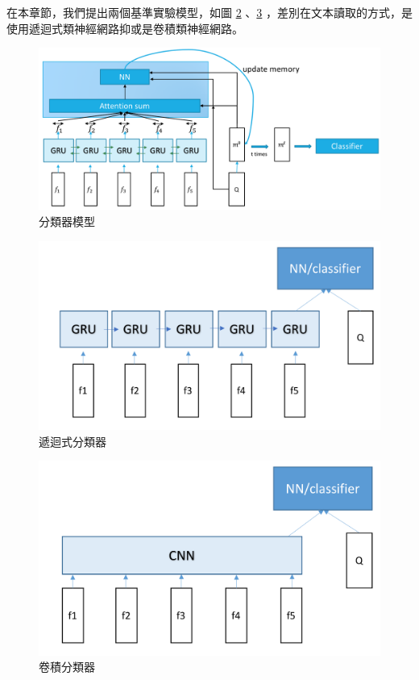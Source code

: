 在本章節，我們提出兩個基準實驗模型，如圖 \ref{fig:gru_classifier} 、\ref{fig:cnn_classifier} ，差別在文本讀取的方式，是使用遞迴式類神經網路抑或是卷積類神經網路。
\begin{figure}[h]
    \centering
    \includegraphics[scale=0.47]{images/chap4_dmn.png}
    \caption{分類器模型}
    \label{fig:dmn_classifier}
\end{figure}

\begin{figure}
    \centering
    \includegraphics[scale=0.5]{images/chap4_gru.png}
    \caption{遞迴式分類器}
    \label{fig:gru_classifier}
\end{figure}

\begin{figure}
    \centering
    \includegraphics[scale=0.5]{images/chap4_cnn.png}
    \caption{卷積分類器}
    \label{fig:cnn_classifier}
\end{figure}

